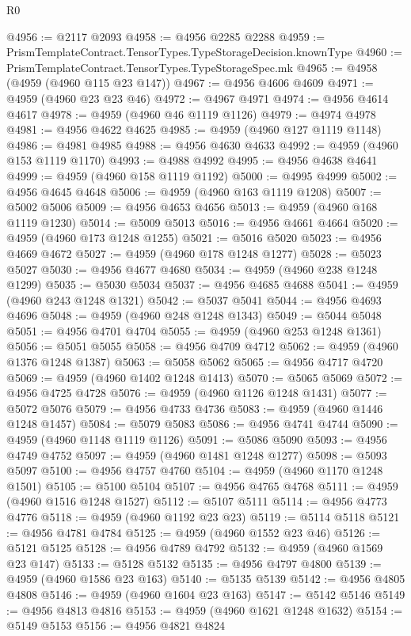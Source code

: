 \begin{lexlean}{R0}
\begin{coremodule}
@4956 := @2117 @2093
@4958 := @4956 @2285 @2288
@4959 := PrismTemplateContract.TensorTypes.TypeStorageDecision.knownType
@4960 := PrismTemplateContract.TensorTypes.TypeStorageSpec.mk
@4965 := @4958 (@4959 (@4960 @115 @23 @147))
@4967 := @4956 @4606 @4609
@4971 := @4959 (@4960 @23 @23 @46)
@4972 := @4967 @4971
@4974 := @4956 @4614 @4617
@4978 := @4959 (@4960 @46 @1119 @1126)
@4979 := @4974 @4978
@4981 := @4956 @4622 @4625
@4985 := @4959 (@4960 @127 @1119 @1148)
@4986 := @4981 @4985
@4988 := @4956 @4630 @4633
@4992 := @4959 (@4960 @153 @1119 @1170)
@4993 := @4988 @4992
@4995 := @4956 @4638 @4641
@4999 := @4959 (@4960 @158 @1119 @1192)
@5000 := @4995 @4999
@5002 := @4956 @4645 @4648
@5006 := @4959 (@4960 @163 @1119 @1208)
@5007 := @5002 @5006
@5009 := @4956 @4653 @4656
@5013 := @4959 (@4960 @168 @1119 @1230)
@5014 := @5009 @5013
@5016 := @4956 @4661 @4664
@5020 := @4959 (@4960 @173 @1248 @1255)
@5021 := @5016 @5020
@5023 := @4956 @4669 @4672
@5027 := @4959 (@4960 @178 @1248 @1277)
@5028 := @5023 @5027
@5030 := @4956 @4677 @4680
@5034 := @4959 (@4960 @238 @1248 @1299)
@5035 := @5030 @5034
@5037 := @4956 @4685 @4688
@5041 := @4959 (@4960 @243 @1248 @1321)
@5042 := @5037 @5041
@5044 := @4956 @4693 @4696
@5048 := @4959 (@4960 @248 @1248 @1343)
@5049 := @5044 @5048
@5051 := @4956 @4701 @4704
@5055 := @4959 (@4960 @253 @1248 @1361)
@5056 := @5051 @5055
@5058 := @4956 @4709 @4712
@5062 := @4959 (@4960 @1376 @1248 @1387)
@5063 := @5058 @5062
@5065 := @4956 @4717 @4720
@5069 := @4959 (@4960 @1402 @1248 @1413)
@5070 := @5065 @5069
@5072 := @4956 @4725 @4728
@5076 := @4959 (@4960 @1126 @1248 @1431)
@5077 := @5072 @5076
@5079 := @4956 @4733 @4736
@5083 := @4959 (@4960 @1446 @1248 @1457)
@5084 := @5079 @5083
@5086 := @4956 @4741 @4744
@5090 := @4959 (@4960 @1148 @1119 @1126)
@5091 := @5086 @5090
@5093 := @4956 @4749 @4752
@5097 := @4959 (@4960 @1481 @1248 @1277)
@5098 := @5093 @5097
@5100 := @4956 @4757 @4760
@5104 := @4959 (@4960 @1170 @1248 @1501)
@5105 := @5100 @5104
@5107 := @4956 @4765 @4768
@5111 := @4959 (@4960 @1516 @1248 @1527)
@5112 := @5107 @5111
@5114 := @4956 @4773 @4776
@5118 := @4959 (@4960 @1192 @23 @23)
@5119 := @5114 @5118
@5121 := @4956 @4781 @4784
@5125 := @4959 (@4960 @1552 @23 @46)
@5126 := @5121 @5125
@5128 := @4956 @4789 @4792
@5132 := @4959 (@4960 @1569 @23 @147)
@5133 := @5128 @5132
@5135 := @4956 @4797 @4800
@5139 := @4959 (@4960 @1586 @23 @163)
@5140 := @5135 @5139
@5142 := @4956 @4805 @4808
@5146 := @4959 (@4960 @1604 @23 @163)
@5147 := @5142 @5146
@5149 := @4956 @4813 @4816
@5153 := @4959 (@4960 @1621 @1248 @1632)
@5154 := @5149 @5153
@5156 := @4956 @4821 @4824

\end{coremodule}
\end{lexlean}
